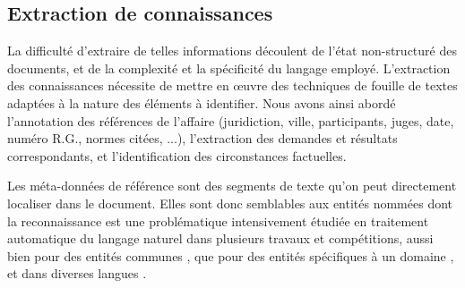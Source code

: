 
\subsection{Extraction de connaissances}
\label{subsec:intro:ie}
La difficulté d'extraire de telles informations découlent de l'état non-structuré des documents, et de la complexité et la spécificité du langage employé. L'extraction des connaissances nécessite de mettre en \oe uvre des techniques de fouille de textes adaptées à la nature des éléments à identifier. Nous avons ainsi abordé l'annotation des références de l'affaire (juridiction, ville, participants, juges, date, numéro R.G., normes citées, ...), l'extraction des demandes et résultats correspondants, et l'identification des circonstances factuelles.

Les méta-données de référence sont des segments de texte qu'on peut directement localiser dans le document. Elles sont donc semblables aux entités nommées dont la reconnaissance est une problématique intensivement étudiée en traitement automatique du langage naturel \citep{yadav2018surveyNeuralNER} dans plusieurs travaux et compétitions, aussi bien pour des entités communes \citep{tjong2003introCoNLL,grishman1996muc6}, que pour des entités spécifiques à un domaine \citep{kim2004bioNer, persson2012nbbioner,hanisch2005prominer}, et dans diverses langues \citep{li2018wcpbioner,alfred2014malayner,amarappa2015kannada}. 

